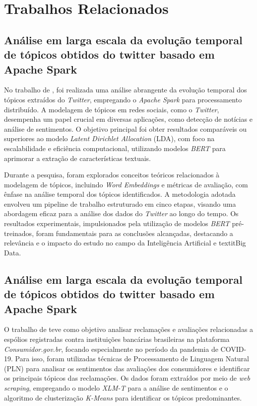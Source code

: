 \chapter{Trabalhos Relacionados}
\label{cap:trabalhos_relacionados}


\section{Análise em larga escala da evolução temporal de tópicos obtidos do twitter basado em Apache Spark}
\label{cap:trabalhos_relacionados:sec:braulio}

No trabalho de , foi realizada uma análise abrangente da evolução temporal dos tópicos extraídos do \textit{Twitter}, empregando o \textit{Apache Spark} para processamento distribuído. A modelagem de tópicos em redes sociais, como o \textit{Twitter}, desempenha um papel crucial em diversas aplicações, como detecção de notícias e análise de sentimentos. O objetivo principal foi obter resultados comparáveis ou superiores ao modelo \textit{Latent Dirichlet Allocation} (LDA), com foco na escalabilidade e eficiência computacional, utilizando modelos \textit{BERT} para aprimorar a extração de características textuais.

Durante a pesquisa, foram explorados conceitos teóricos relacionados à modelagem de tópicos, incluindo \textit{Word Embeddings} e métricas de avaliação, com ênfase na análise temporal dos tópicos identificados. A metodologia adotada envolveu um pipeline de trabalho estruturado em cinco etapas, visando uma abordagem eficaz para a análise dos dados do \textit{Twitter} ao longo do tempo. Os resultados experimentais, impulsionados pela utilização de modelos \textit{BERT} pré-treinados, foram fundamentais para as conclusões alcançadas, destacando a relevância e o impacto do estudo no campo da Inteligência Artificial e textit{Big Data}.


\section{Análise em larga escala da evolução temporal de tópicos obtidos do twitter basado em Apache Spark}
\label{cap:trabalhos_relacionados:sec:braulio}

O trabalho de  teve como objetivo analisar reclamações e avaliações relacionadas a espólios registradas contra instituições bancárias brasileiras na plataforma \textit{Consumidor.gov.br}, focando especialmente no período da pandemia de COVID-19. Para isso, foram utilizadas técnicas de Processamento de Linguagem Natural (PLN) para analisar os sentimentos das avaliações dos consumidores e identificar os principais tópicos das reclamações. Os dados foram extraídos por meio de \textit{web scraping}, empregando o modelo \textit{XLM-T} para a análise de sentimentos e o algoritmo de clusterização \textit{K-Means} para identificar os tópicos predominantes.

